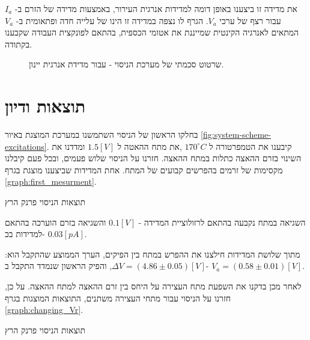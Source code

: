 \documentclass{article}
\begin{document}
את מדידה זו ביצענו באופן דומה למדידות אנרגית העירור, באמצעות מדידה של הזרם ב-
$I_a$
עבור רצף של ערכי
$V_a$.
הגרף לו נצפה במדידה זו הינו של עלייה חדה ופתאומית ב-
$V_a$
המתאים לאנרגיה הקינטית שמייננת את אטומי הכספית, בהתאם לפונקצית העבודה שקבענו בקתודה.

\begin{figure}
    \centering
    \caption{
    שרטוט סכמתי של מערכת הניסוי - עבור מדידת אנרגית יינון.
    }
    \label{fig:system-scheme-ionization}
\end{figure}

\clearpage

\section{תוצאות ודיון}
בחלקו הראשון של הניסוי השתמשנו במערכת המוצגת באיור
\ref{fig:system-scheme-excitations}.
קיבענו את הטמפרטורה ל
$170 ^{\circ} C$
,את מתח ההאטה ל
$1.5 [V]$
ומדדנו את השינוי בזרם ההאצה כתלות במתח ההאצה.
חזרנו על הניסוי שלוש פעמים, ובכל פעם קיבלנו מקסימות של זרמים בהפרשים קבועים של המתח.
אחת המדידות שביצענו מוצגת בגרף
\ref{graph:first_mesurment}.
 
\begin{graph}[H]
	\begin{center}
	\resizebox{\textwidth}{!}{}
	\end{center}
	\caption{תוצאות הניסוי פרנק הרץ}
\label{graph:first_mesurment}
\end{graph}

השגיאה במתח נקבעה בהתאם לרזולוציית המדידה - 
$0.1 [V]$
והשגיאה בזרם הוערכה בהתאם למדידות בכ- 
$0.03 [pA]$.

מתוך שלושת המדידות חילצנו את ההפרש במתח בין הפיקים, הערך הממוצע שהתקבל הוא:
$\Delta V = (4.86 \pm 0.05)[V]$,
והפיק הראשון שנמדד התקבל ב- 
$V_a = (0.58 \pm 0.01)[V]$.

לאחר מכן בדקנו את השפעת מתח העצירה על היחס בין זרם ההאצה למתח ההאצה.
על כן, חזרנו על הניסוי עבור מתחי העצירה משתנים, התוצאות המוצגות בגרף
\ref{graph:changing_Vr}.

\begin{graph}[H]
	\begin{center}
	\resizebox{\textwidth}{!}{}
	\end{center}
	\caption{תוצאות הניסוי פרנק הרץ}
	\label{graph:changing_Vr}
\end{graph}
\end{document}
